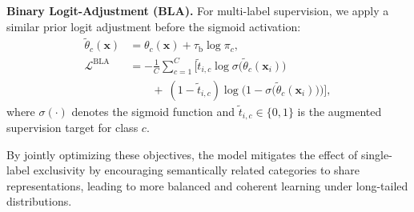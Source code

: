 \noindent \textbf{Binary Logit-Adjustment (BLA).}
For multi-label supervision, we apply a similar prior logit adjustment before the sigmoid activation:
\begin{equation}
\begin{split}
\tilde\theta_c(\mathbf{x}) &= \theta_c(\mathbf{x}) + \tau_{\text{b}}\log \pi_c, \\
\mathcal{L}^{\text{BLA}}
&= -\frac{1}{C}\sum_{c=1}^{C}\Big[
\tilde{t}_{i,c}\log\sigma\!\big(\tilde\theta_c(\mathbf{x}_i)\big) \\
&\qquad
+~(1-\tilde{t}_{i,c})\log\!\big(1-\sigma\!\big(\tilde\theta_c(\mathbf{x}_i)\big)\big)
\Big],
\end{split}
\end{equation}
where $\sigma(\cdot)$ denotes the sigmoid function and $\tilde{t}_{i,c}\!\in\!\{0,1\}$ is the augmented supervision target for class $c$.

By jointly optimizing these objectives, the model mitigates the effect of single-label exclusivity by encouraging semantically related categories to share representations, leading to more balanced and coherent learning under long-tailed distributions.








